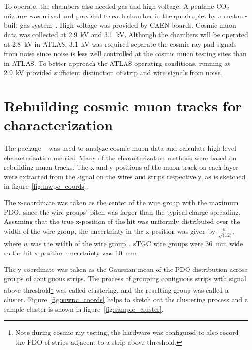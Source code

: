 To operate, the chambers also needed gas and high voltage. A pentane-CO$_{2}$ mixture was mixed and provided to each chamber in the quadruplet by a custom-built gas system~\cite{keyes_development_2017}. High voltage was provided by CAEN boards. Cosmic muon data was collected at 2.9~kV and 3.1~kV. Although the chambers will be operated at 2.8~kV in ATLAS, 3.1~kV was required separate the cosmic ray pad signals from noise since noise is less well controlled at the cosmic muon testing sites than in ATLAS. To better approach the ATLAS operating conditions, running at 2.9~kV provided sufficient distinction of strip and wire signals from noise.

\section{Rebuilding cosmic muon tracks for characterization}

The package ~\cite{lefebvre_tgc_analysis} was used to analyze cosmic muon data and calculate high-level characterization metrics. Many of the characterization methods were based on rebuilding muon tracks. The x and y positions of the muon track on each layer were extracted from the signal on the wires and strips respectively, as is sketched in figure~\ref{fig:mwpc_coords}.

The x-coordinate was taken as the center of the wire group with the maximum PDO, since the wire groups' pitch was larger than the typical charge spreading. Assuming that the true x-position of the hit was uniformly distributed over the width of the wire group, the uncertainty in the x-position was given by $\frac{w}{\sqrt(12)}$, where $w$ was the width of the wire group~\cite{Sauli:117989}. sTGC wire groups were \SI{36}{\milli\meter} wide so the hit x-position uncertainty was \SI{10}{\milli\meter}.

The y-coordinate was taken as the Gaussian mean of the PDO distribution across groups of contiguous strips. The process of grouping contiguous strips with signal above threshold\footnote{Note during cosmic ray testing, the hardware was configured to also record the PDO of strips adjacent to a strip above threshold.} was called clustering, and the resulting group was called a cluster. Figure~\ref{fig:mwpc_coords} helps to sketch out the clustering process and a sample cluster is shown in figure~\ref{fig:sample_cluster}.

